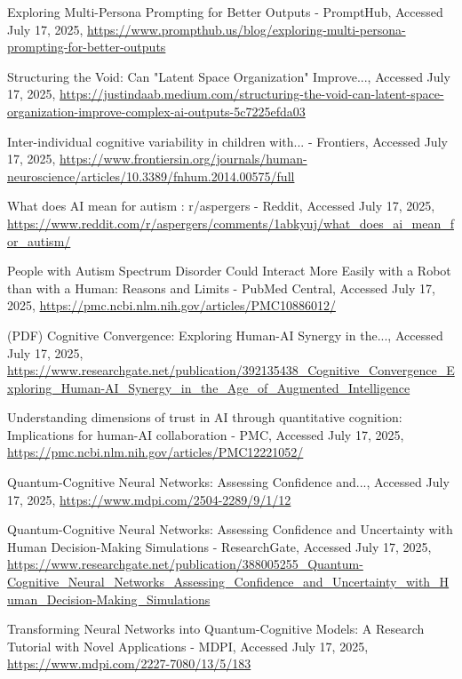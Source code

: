 \documentclass[10pt,twocolumn]{article}
\begin{document}
\begin{thebibliography}{68}
Exploring Multi-Persona Prompting for Better Outputs - PromptHub, Accessed July 17, 2025, \url{https://www.prompthub.us/blog/exploring-multi-persona-prompting-for-better-outputs}

Structuring the Void: Can "Latent Space Organization" Improve..., Accessed July 17, 2025, \url{https://justindaab.medium.com/structuring-the-void-can-latent-space-organization-improve-complex-ai-outputs-5c7225efda03}

Inter-individual cognitive variability in children with... - Frontiers, Accessed July 17, 2025, \url{https://www.frontiersin.org/journals/human-neuroscience/articles/10.3389/fnhum.2014.00575/full}

What does AI mean for autism : r/aspergers - Reddit, Accessed July 17, 2025, \url{https://www.reddit.com/r/aspergers/comments/1abkyuj/what_does_ai_mean_for_autism/}

People with Autism Spectrum Disorder Could Interact More Easily with a Robot than with a Human: Reasons and Limits - PubMed Central, Accessed July 17, 2025, \url{https://pmc.ncbi.nlm.nih.gov/articles/PMC10886012/}

(PDF) Cognitive Convergence: Exploring Human-AI Synergy in the..., Accessed July 17, 2025, \url{https://www.researchgate.net/publication/392135438_Cognitive_Convergence_Exploring_Human-AI_Synergy_in_the_Age_of_Augmented_Intelligence}

Understanding dimensions of trust in AI through quantitative cognition: Implications for human-AI collaboration - PMC, Accessed July 17, 2025, \url{https://pmc.ncbi.nlm.nih.gov/articles/PMC12221052/}

Quantum-Cognitive Neural Networks: Assessing Confidence and..., Accessed July 17, 2025, \url{https://www.mdpi.com/2504-2289/9/1/12}

Quantum-Cognitive Neural Networks: Assessing Confidence and Uncertainty with Human Decision-Making Simulations - ResearchGate, Accessed July 17, 2025, \url{https://www.researchgate.net/publication/388005255_Quantum-Cognitive_Neural_Networks_Assessing_Confidence_and_Uncertainty_with_Human_Decision-Making_Simulations}

Transforming Neural Networks into Quantum-Cognitive Models: A Research Tutorial with Novel Applications - MDPI, Accessed July 17, 2025, \url{https://www.mdpi.com/2227-7080/13/5/183}


\end{thebibliography}
\end{document}

